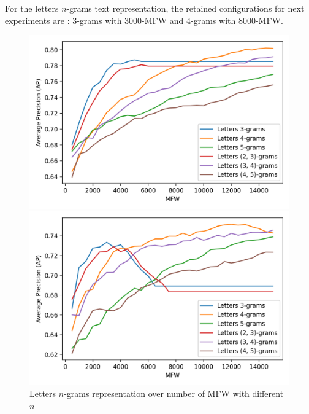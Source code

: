 For the letters $n$-grams text representation, the retained configurations for next experiments are : $3$-grams with $3000$-MFW and $4$-grams with $8000$-MFW.

\begin{figure}
  \caption{Letters $n$-grams representation over number of MFW with different $n$}
  \label{fig:letter_ngrams}

  \label{fig:letter_ngrams_oxquarry}
  \includegraphics[width=\linewidth]{img/letter_ngrams_oxquarry.png}

  \label{fig:letter_ngrams_brunet}
  \includegraphics[width=\linewidth]{img/letter_ngrams_brunet.png}


\end{figure}
